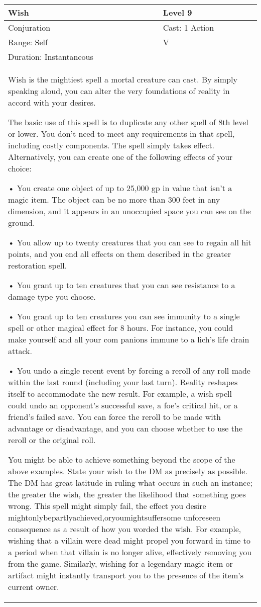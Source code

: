 \documentclass[11pt]{report}
\begin{document}
\begin{table}[H]
	\begin{tabular}{||p{6cm}|p{6cm}||}
		\hline\hline
		\bf{Wish} & Level 9\\ \hline
		Conjuration & Cast: 1 Action\\ \hline
		Range: Self & V\\ \hline
		Duration: Instantaneous & \\ \hline
		\multicolumn{2}{||p{12cm}||}{Wish is the mightiest spell a mortal creature can cast. By simply speaking aloud, you can alter the very foundations of reality in accord with your desires.

The basic use of this spell is to duplicate any other spell of 8th level or lower. You don’t need to meet any requirements in that spell, including costly components. The spell simply takes effect.
Alternatively, you can create one of the following effects of your choice:

• You create one object of up to 25,000 gp in value that isn’t a magic item. The object can be no more than 300 feet in any dimension, and it appears in an unoccupied space you can see on the ground.

• You allow up to twenty creatures that you can see to regain all hit points, and you end all effects on them described in the greater restoration spell.

• You grant up to ten creatures that you can see resistance to a damage type you choose.

• You grant up to ten creatures you can see immunity to a single spell or other magical effect for 8 hours. For instance, you could make yourself and all your com panions immune to a lich’s life drain attack.

• You undo a single recent event by forcing a reroll of any roll made within the last round (including your last turn). Reality reshapes itself to accommodate the new result. For example, a wish spell could undo an opponent’s successful save, a foe’s critical hit, or a friend’s failed save. You can force the reroll to be made with advantage or disadvantage, and you can choose whether to use the reroll or the original roll.

You might be able to achieve something beyond the scope of the above examples. State your wish to the DM as precisely as possible. The DM has great latitude in ruling what occurs in such an instance; the greater the wish, the greater the likelihood that something goes wrong. This spell might simply fail, the effect you desire mightonlybepartlyachieved,oryoumightsuffersome unforeseen consequence as a result of how you worded the wish. For example, wishing that a villain were dead might propel you forward in time to a period when that villain is no longer alive, effectively removing you from the game. Similarly, wishing for a legendary magic item or artifact might instantly transport you to the presence of the item’s current owner.

}
\end{tabular}
\end{table}
\end{document}
